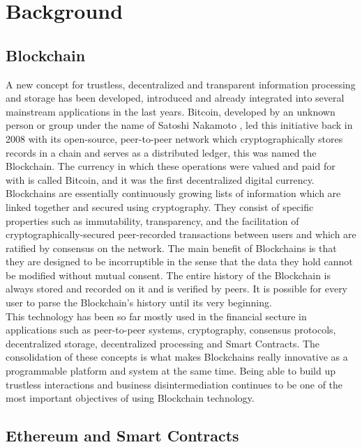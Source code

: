 \section{Background}

\subsection{Blockchain}

A new concept for trustless, decentralized and transparent information processing and storage has been developed, introduced and already integrated into several mainstream applications in the last years. Bitcoin, developed by an unknown person or group under the name of Satoshi Nakamoto \cite{nakamoto2008bitcoin}, led this initiative back in 2008 with its open-source, peer-to-peer network which cryptographically stores records in a chain and serves as a distributed ledger, this was named the Blockchain. The currency in which these operations were valued and paid for with is called Bitcoin, and it was the first decentralized digital currency.\\

Blockchains are essentially continuously growing lists of information which are linked together and secured using cryptography. They consist of specific properties such as immutability, transparency, and the facilitation of cryptographically-secured peer-recorded transactions between users and  which are ratified by consensus on the network.
The main benefit of Blockchains is that they are designed to be incorruptible in the sense that the data they hold cannot be modified without mutual consent. The entire history of the Blockchain is always stored and recorded on it and is verified by peers. It is possible for every user to parse the Blockchain's history until its very beginning.\\

This technology has been so far mostly used in the financial secture in applications such as peer-to-peer systems, cryptography, consensus protocols, decentralized storage, decentralized processing and Smart Contracts. The consolidation of these concepts is what makes Blockchains really innovative as a programmable platform and system at the same time.
Being able to build up trustless interactions and business disintermediation continues to be one of the most important objectives of using Blockchain technology.

\subsection{Ethereum and Smart Contracts}

